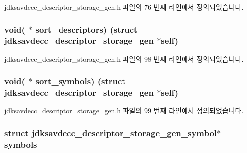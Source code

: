 jdksavdecc\+\_\+descriptor\+\_\+storage\+\_\+gen.\+h 파일의 76 번째 라인에서 정의되었습니다.

\subsubsection[{\texorpdfstring{sort\+\_\+descriptors}{sort_descriptors}}]{\setlength{\rightskip}{0pt plus 5cm}void( $\ast$ sort\+\_\+descriptors) (struct {\bf jdksavdecc\+\_\+descriptor\+\_\+storage\+\_\+gen} $\ast$self)}\hypertarget{structjdksavdecc__descriptor__storage__gen_a68d99b15ec94039ed0e21b6b8c55b19e}{}\label{structjdksavdecc__descriptor__storage__gen_a68d99b15ec94039ed0e21b6b8c55b19e}


jdksavdecc\+\_\+descriptor\+\_\+storage\+\_\+gen.\+h 파일의 98 번째 라인에서 정의되었습니다.

\subsubsection[{\texorpdfstring{sort\+\_\+symbols}{sort_symbols}}]{\setlength{\rightskip}{0pt plus 5cm}void( $\ast$ sort\+\_\+symbols) (struct {\bf jdksavdecc\+\_\+descriptor\+\_\+storage\+\_\+gen} $\ast$self)}\hypertarget{structjdksavdecc__descriptor__storage__gen_a88273f7f9ae49432dc1ee1a3bacc5273}{}\label{structjdksavdecc__descriptor__storage__gen_a88273f7f9ae49432dc1ee1a3bacc5273}


jdksavdecc\+\_\+descriptor\+\_\+storage\+\_\+gen.\+h 파일의 99 번째 라인에서 정의되었습니다.

\subsubsection[{\texorpdfstring{symbols}{symbols}}]{\setlength{\rightskip}{0pt plus 5cm}struct {\bf jdksavdecc\+\_\+descriptor\+\_\+storage\+\_\+gen\+\_\+symbol}$\ast$ symbols}\hypertarget{structjdksavdecc__descriptor__storage__gen_a4998980e6ac72e8672980a51315716c9}{}\label{structjdksavdecc__descriptor__storage__gen_a4998980e6ac72e8672980a51315716c9}


